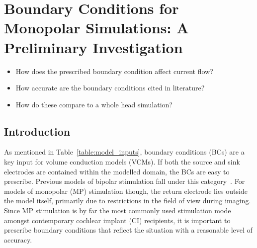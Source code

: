 	\pagestyle{fancy}
	\chead{}
	\rhead{{\sffamily \MakeUppercase\rightmark}}
	\lfoot{}
	\cfoot{{\sffamily \thepage}}
	\rfoot{}
	
\chapter{Boundary Conditions for Monopolar Simulations: A Preliminary
Investigation}
\label{sect:boundary_conditions}

\begin{center}
	\begin{tcolorbox}[title=\boxtitle]
		\begin{itemize}[leftmargin=*,labelindent=2ex,labelsep=1.5ex,itemsep=0pt,parsep=0pt]
			\item How does the prescribed boundary condition affect current flow?
			\item How accurate are the boundary conditions cited in literature?
			\item How do these compare to a whole head simulation?
		\end{itemize}
	\end{tcolorbox}
\end{center}


\section{Introduction}

As mentioned in Table~\ref{table:model_inputs}, boundary conditions (BCs) are a
key input for volume conduction models (VCMs). If both the source and sink
electrodes are contained within the modelled domain, the BCs are easy to
prescribe. Previous models of bipolar stimulation fall under this
category~\cite{finley1990,frijns1995,hanekom2001,choi2004}. For models of
monopolar (MP) stimulation though, the return electrode lies outside the model
itself, primarily due to restrictions in the field of view during imaging. Since
MP stimulation is by far the most commonly used stimulation mode amongst
contemporary cochlear implant (CI) recipients, it is important to prescribe
boundary conditions that reflect the \invivo{} situation with a reasonable
level of accuracy.

